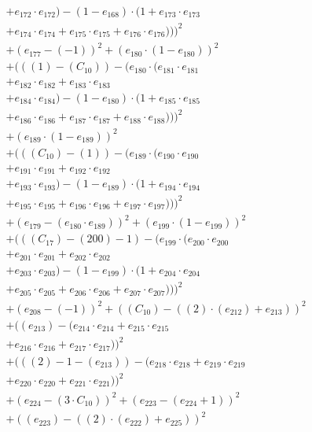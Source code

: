 \documentclass[10pt, a4paper]{article}
\begin{document}
\begin{align*}
& + e_{172} \cdot e_{172}) - (1 - e_{168}) \cdot (1 + e_{173} \cdot e_{173} \\
& + e_{174} \cdot e_{174} + e_{175} \cdot e_{175} + e_{176} \cdot e_{176})))^{2} \\
& + (e_{177} - (-1))^{2} + (e_{180} \cdot (1 - e_{180}))^{2} \\
& + (((1) - (C_{10})) - (e_{180} \cdot (e_{181} \cdot e_{181} \\
& + e_{182} \cdot e_{182} + e_{183} \cdot e_{183} \\
& + e_{184} \cdot e_{184}) - (1 - e_{180}) \cdot (1 + e_{185} \cdot e_{185} \\
& + e_{186} \cdot e_{186} + e_{187} \cdot e_{187} + e_{188} \cdot e_{188})))^{2} \\
& + (e_{189} \cdot (1 - e_{189}))^{2} \\
& + (((C_{10}) - (1)) - (e_{189} \cdot (e_{190} \cdot e_{190} \\
& + e_{191} \cdot e_{191} + e_{192} \cdot e_{192} \\
& + e_{193} \cdot e_{193}) - (1 - e_{189}) \cdot (1 + e_{194} \cdot e_{194} \\
& + e_{195} \cdot e_{195} + e_{196} \cdot e_{196} + e_{197} \cdot e_{197})))^{2} \\
& + (e_{179} - (e_{180} \cdot e_{189}))^{2} + (e_{199} \cdot (1 - e_{199}))^{2} \\
& + (((C_{17}) - (200) - 1) - (e_{199} \cdot (e_{200} \cdot e_{200} \\
& + e_{201} \cdot e_{201} + e_{202} \cdot e_{202} \\
& + e_{203} \cdot e_{203}) - (1 - e_{199}) \cdot (1 + e_{204} \cdot e_{204} \\
& + e_{205} \cdot e_{205} + e_{206} \cdot e_{206} + e_{207} \cdot e_{207})))^{2} \\
& + (e_{208} - (-1))^{2} + ((C_{10}) - ((2)  \cdot  (e_{212}) + e_{213}))^{2} \\
& + ((e_{213}) - (e_{214} \cdot e_{214} + e_{215} \cdot e_{215} \\
& + e_{216} \cdot e_{216} + e_{217} \cdot e_{217}))^{2} \\
& + (((2) - 1 - (e_{213})) - (e_{218} \cdot e_{218} + e_{219} \cdot e_{219} \\
& + e_{220} \cdot e_{220} + e_{221} \cdot e_{221}))^{2} \\
& + (e_{224} - (3  \cdot  C_{10}))^{2} + (e_{223} - (e_{224} + 1))^{2} \\
& + ((e_{223}) - ((2)  \cdot  (e_{222}) + e_{225}))^{2} \\

\end{align*}
\end{document}
